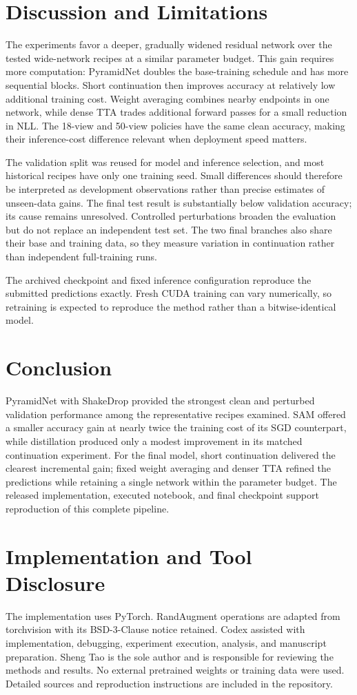 \documentclass[letterpaper]{article}
\begin{document}
\section{Discussion and Limitations}
The experiments favor a deeper, gradually widened residual network over the tested wide-network recipes at a similar parameter budget. This gain requires more computation: PyramidNet doubles the base-training schedule and has more sequential blocks. Short continuation then improves accuracy at relatively low additional training cost. Weight averaging combines nearby endpoints in one network, while dense TTA trades additional forward passes for a small reduction in NLL. The 18-view and 50-view policies have the same clean accuracy, making their inference-cost difference relevant when deployment speed matters.

The validation split was reused for model and inference selection, and most historical recipes have only one training seed. Small differences should therefore be interpreted as development observations rather than precise estimates of unseen-data gains. The final test result is substantially below validation accuracy; its cause remains unresolved. Controlled perturbations broaden the evaluation but do not replace an independent test set. The two final branches also share their base and training data, so they measure variation in continuation rather than independent full-training runs.

The archived checkpoint and fixed inference configuration reproduce the submitted predictions exactly. Fresh CUDA training can vary numerically, so retraining is expected to reproduce the method rather than a bitwise-identical model.

\section{Conclusion}
PyramidNet with ShakeDrop provided the strongest clean and perturbed validation performance among the representative recipes examined. SAM offered a smaller accuracy gain at nearly twice the training cost of its SGD counterpart, while distillation produced only a modest improvement in its matched continuation experiment. For the final model, short continuation delivered the clearest incremental gain; fixed weight averaging and denser TTA refined the predictions while retaining a single network within the parameter budget. The released implementation, executed notebook, and final checkpoint support reproduction of this complete pipeline.

\section*{Implementation and Tool Disclosure}
The implementation uses PyTorch. RandAugment operations are adapted from torchvision with its BSD-3-Clause notice retained. Codex assisted with implementation, debugging, experiment execution, analysis, and manuscript preparation. Sheng Tao is the sole author and is responsible for reviewing the methods and results. No external pretrained weights or training data were used. Detailed sources and reproduction instructions are included in the repository.

\end{document}
